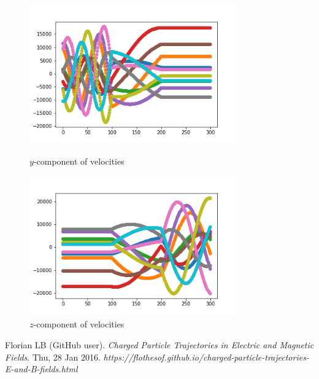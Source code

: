 \documentclass[12pt]{article}
\begin{document}
	\begin{figure}[H]
		\begin{multicols}{2}
			\includegraphics[width=\linewidth, height=6cm]{multivsy2.png} \caption{$y$-component of velocities} \label{multivsy2} \par
			\includegraphics[width=\linewidth, height=6cm]{multivsz2.png} \caption{$z$-component of velocities} \label{multivsz2} \par
		\end{multicols}
	\end{figure}

\begin{thebibliography}{}
	 Florian LB (GitHub user). \textit{Charged Particle Trajectories in Electric and Magnetic Fields}. Thu, 28 Jan 2016. \textit{https://flothesof.github.io/charged-particle-trajectories-E-and-B-fields.html}
\end{thebibliography}
\end{document}
